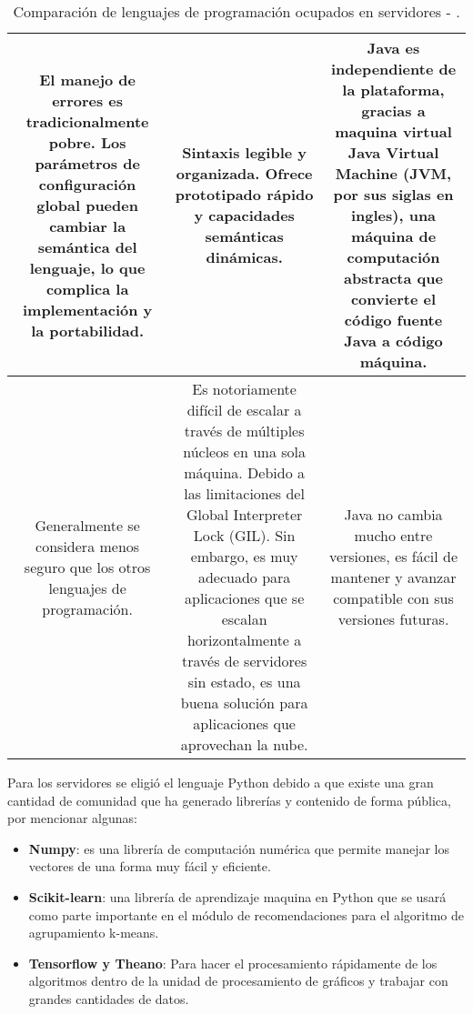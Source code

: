 \begin{table}[htb]
\begin{tabularx}{\textwidth}{|C|C|C|}
\\ \hline
El manejo de errores es tradicionalmente pobre. Los parámetros de configuración global pueden cambiar la semántica del lenguaje, lo que complica la implementación y la portabilidad. & Sintaxis legible y organizada. Ofrece prototipado rápido y capacidades semánticas dinámicas.  & Java es independiente de la plataforma, gracias a maquina virtual Java Virtual Machine (JVM, por sus siglas en ingles), una máquina de computación abstracta que convierte el código fuente Java a código máquina.
\\ \hline
Generalmente se considera menos seguro que los otros lenguajes de programación. & Es notoriamente difícil de escalar a través de múltiples núcleos en una sola máquina. Debido a las limitaciones del Global Interpreter Lock (GIL). Sin embargo, es muy adecuado para aplicaciones que se escalan horizontalmente a través de servidores sin estado, es una buena solución para aplicaciones que aprovechan la nube.  & Java no cambia mucho entre versiones, es fácil de mantener y avanzar compatible con sus versiones futuras. 
\\ \hline
\end{tabularx}
\caption{Comparación de lenguajes de programación ocupados en servidores \cite{BackEnd1} - \cite{BackEnd4}. }
\label{table:comparacion-backend}
\end{table}
\FloatBarrier


Para los servidores se eligió el lenguaje Python debido a que existe una gran cantidad de comunidad que ha generado librerías y contenido de forma pública, por mencionar algunas: \\ 


\FloatBarrier
\begin{itemize}
\item \textbf{Numpy}: es una librería de computación numérica que permite manejar los vectores de una forma muy fácil y eficiente.
\item \textbf{Scikit-learn}: una librería de aprendizaje maquina en Python que se usará como parte importante en el módulo de recomendaciones para el algoritmo de agrupamiento k-means.
\item \textbf{Tensorflow y Theano}: Para hacer el procesamiento rápidamente de los algoritmos dentro de la unidad de procesamiento de gráficos y trabajar con grandes cantidades de datos.
\end{itemize}
\FloatBarrier